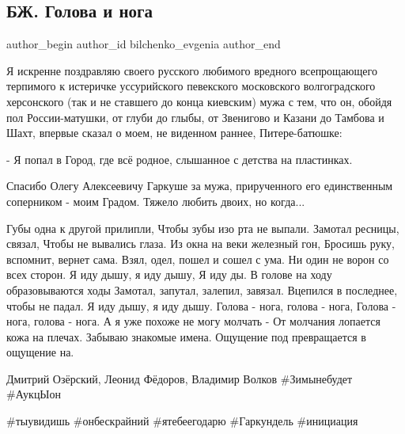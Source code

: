  
 
 
 
 
 
\subsection{БЖ. Голова и нога}
\label{sec:22_11_2021.fb.bilchenko_evgenia.1.golova_i_noga}
 
\ifcmt
 author_begin
   author_id bilchenko_evgenia
 author_end
\fi


Я искренне поздравляю своего русского любимого вредного  всепрощающего
терпимого к истеричке уссурийского певекского московского волгоградского
херсонского (так и не ставшего до конца киевским) мужа с тем, что он, обойдя
пол России-матушки, от глуби до глыбы, от Звенигово и Казани до Тамбова и Шахт,
впервые сказал о моем, не виденном раннее, Питере-батюшке: 

- Я попал в Город, где всё родное, слышанное с детства на пластинках.


Спасибо Олегу Алексеевичу Гаркуше за мужа, прирученного его единственным
соперником - моим Градом. Тяжело любить двоих, но когда...

\begin{multicols}{2}
\obeycr
Губы одна к другой прилипли,
Чтобы зубы изо рта не выпали.
Замотал ресницы, связал,
Чтобы не вывались глаза.
\smallskip
Из окна на веки железный гон,
Бросишь руку, вспомнит, вернет сама.
Взял, одел, пошел и сошел с ума.
Ни один не ворон со всех сторон.
\smallskip
Я иду дышу,
я иду дышу,
Я иду ды.
В голове на ходу образовываются ходы
Замотал, запутал, залепил, завязал.
\smallskip
Вцепился в последнее, чтобы не падал.
Я иду дышу,
я иду дышу.
Голова - нога, голова - нога,
Голова - нога, голова - нога.
\smallskip
А я уже похоже не могу молчать -
От молчания лопается кожа на плечах.
Забываю знакомые имена.
Ощущение под превращается в ощущение на.
\restorecr
\end{multicols}


Дмитрий Озёрский, Леонид Фёдоров, Владимир Волков \#Зимынебудет \#АукцЫон

\#тыувидишь \#онбескрайний \#ятебеегодарю
\#Гаркундель \#инициация

